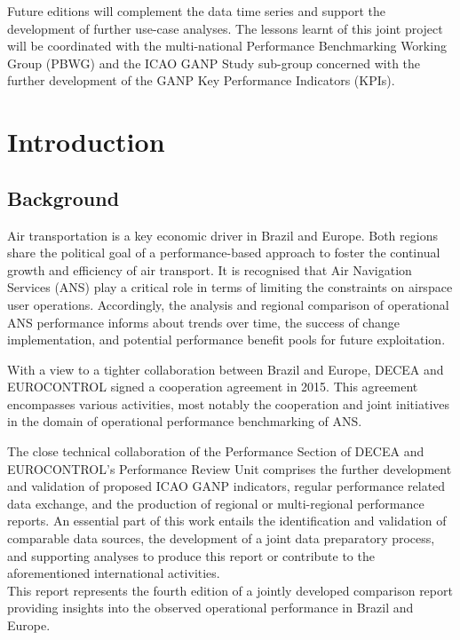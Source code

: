 \documentclass[
  a4paper,
  DIV=11,
  numbers=noendperiod]{scrreport}
\begin{document}
Future editions will complement the data time series and support the
development of further use-case analyses. The lessons learnt of this
joint project will be coordinated with the multi-national Performance
Benchmarking Working Group (PBWG) and the ICAO GANP Study sub-group
concerned with the further development of the GANP Key Performance
Indicators (KPIs).


\chapter{Introduction}\label{introduction}

\setcounter{page}{1}

\section{Background}\label{background}

Air transportation is a key economic driver in Brazil and Europe. Both
regions share the political goal of a performance-based approach to
foster the continual growth and efficiency of air transport. It is
recognised that Air Navigation Services (ANS) play a critical role in
terms of limiting the constraints on airspace user operations.
Accordingly, the analysis and regional comparison of operational ANS
performance informs about trends over time, the success of change
implementation, and potential performance benefit pools for future
exploitation.

With a view to a tighter collaboration between Brazil and Europe, DECEA
and EUROCONTROL signed a cooperation agreement in 2015. This agreement
encompasses various activities, most notably the cooperation and joint
initiatives in the domain of operational performance benchmarking of
ANS.

The close technical collaboration of the Performance Section of DECEA
and EUROCONTROL's Performance Review Unit comprises the further
development and validation of proposed ICAO GANP indicators, regular
performance related data exchange, and the production of regional or
multi-regional performance reports. An essential part of this work
entails the identification and validation of comparable data sources,
the development of a joint data preparatory process, and supporting
analyses to produce this report or contribute to the aforementioned
international activities.\\
This report represents the fourth edition of a jointly developed
comparison report providing insights into the observed operational
performance in Brazil and Europe.
\end{document}
